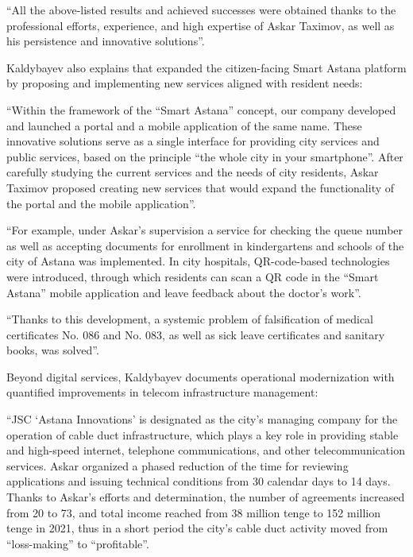 \begin{fullquote}
``All the above-listed results and achieved successes were obtained thanks to the professional efforts, experience, and high expertise of Askar Taximov, as well as his persistence and innovative solutions''.
\end{fullquote}

Kaldybayev also explains that \mrl{} expanded the citizen-facing Smart Astana platform by proposing and implementing new services aligned with resident needs:
\begin{fullquote}
``Within the framework of the “Smart Astana” concept, our company developed and launched a portal and a mobile application of the same name. These innovative solutions serve as a single interface for providing city services and public services, based on the principle “the whole city in your smartphone”. After carefully studying the current services and the needs of city residents, Askar Taximov proposed creating new services that would expand the functionality of the portal and the mobile application''.
\end{fullquote}

\begin{fullquote}
``For example, under Askar’s supervision a service for checking the queue number as well as accepting documents for enrollment in kindergartens and schools of the city of Astana was implemented. In city hospitals, QR-code-based technologies were introduced, through which residents can scan a QR code in the “Smart Astana” mobile application and leave feedback about the doctor’s work''.
\end{fullquote}

\begin{fullquote}
``Thanks to this development, a systemic problem of falsification of medical certificates No. 086 and No. 083, as well as sick leave certificates and sanitary books, was solved''.
\end{fullquote}

Beyond digital services, Kaldybayev documents \mrls operational modernization with quantified improvements in telecom infrastructure management:
\begin{fullquote}
``JSC `Astana Innovations' is designated as the city’s managing company for the operation of cable duct infrastructure, which plays a key role in providing stable and high-speed internet, telephone communications, and other telecommunication services. Askar organized a phased reduction of the time for reviewing applications and issuing technical conditions from 30 calendar days to 14 days. Thanks to Askar’s efforts and determination, the number of agreements increased from 20 to 73, and total income reached from 38 million tenge to 152 million tenge in 2021, thus in a short period the city’s cable duct activity moved from “loss-making” to “profitable”.
\end{fullquote}

